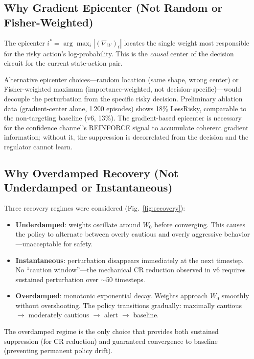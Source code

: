 \documentclass[runningheads]{llncs}
\begin{document}
\subsection{Why Gradient Epicenter (Not Random or Fisher-Weighted)}

The epicenter $i^* = \arg\max_i |(\nabla_W)_i|$ locates the single weight most responsible for the risky action's log-probability. This is the \emph{causal} center of the decision circuit for the current state-action pair.

Alternative epicenter choices---random location (same shape, wrong center) or Fisher-weighted maximum (importance-weighted, not decision-specific)---would decouple the perturbation from the specific risky decision. Preliminary ablation data (gradient-center alone, 1\,200 episodes) shows 18\% LessRisky, comparable to the non-targeting baseline (v6, 13\%). The gradient-based epicenter is necessary for the confidence channel's REINFORCE signal to accumulate coherent gradient information; without it, the suppression is decorrelated from the decision and the regulator cannot learn.

\subsection{Why Overdamped Recovery (Not Underdamped or Instantaneous)}

Three recovery regimes were considered (Fig.~\ref{fig:recovery}):
\begin{itemize}
\item \textbf{Underdamped}: weights oscillate around $W_0$ before converging. This causes the policy to alternate between overly cautious and overly aggressive behavior---unacceptable for safety.
\item \textbf{Instantaneous}: perturbation disappears immediately at the next timestep. No ``caution window''---the mechanical CR reduction observed in v6 requires sustained perturbation over $\sim$50 timesteps.
\item \textbf{Overdamped}: monotonic exponential decay. Weights approach $W_0$ smoothly without overshooting. The policy transitions gradually: maximally cautious $\to$ moderately cautious $\to$ alert $\to$ baseline.
\end{itemize}

The overdamped regime is the only choice that provides both sustained suppression (for CR reduction) and guaranteed convergence to baseline (preventing permanent policy drift).
\end{document}

